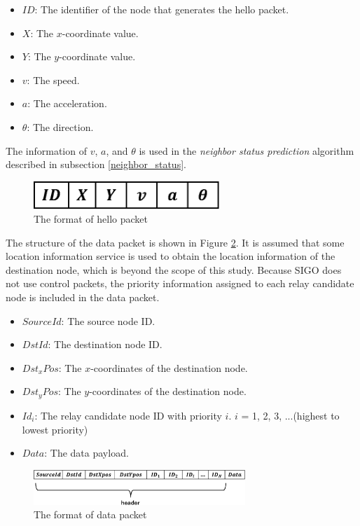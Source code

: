 \documentclass[conference]{IEEEtran}
\begin{document}
\begin{itemize}
\item $ID$: The identifier of the node that generates the hello packet.
\item $X$: The $x$-coordinate value.
\item $Y$: The $y$-coordinate value.
\item $v$: The speed.
\item $a$: The acceleration.
\item $\theta$: The direction.
\end{itemize}
The information of  $v$, $a$, and $\theta$ is used in the \textit{neighbor status prediction} algorithm described in subsection \ref{neighbor_status}.

\begin{figure}[!ht]
\centering
\includegraphics[width=70mm]{figures/Hellopacket_format.eps}
\caption{The format of hello packet}
\label{fig:hellopacket}
\end{figure}

The structure of the data packet is shown in Figure \ref{fig:datapacket}. It is assumed that some location information service is used to obtain the location information of the destination node, which is beyond the scope of this study. 
Because SIGO does not use control packets, the priority information assigned to each relay candidate node is included in the data packet.

\begin{itemize}
\item $SourceId$: The source node ID.
\item $DstId$: The destination node ID.
\item $Dst_x Pos$: The $x$-coordinates of the destination node.
\item $Dst_y Pos$: The $y$-coordinates of the destination node.
\item $Id_i$: The relay candidate node ID with priority $i$. $i$ = 1, 2, 3, ...(highest to lowest priority) 
\item $Data$: The data payload.
\end{itemize}

\begin{figure}[!ht]
\centering
\includegraphics[width=80mm]{figures/data_packet_format.eps}
\caption{The format of data packet}
\label{fig:datapacket}
\end{figure}
\end{document}
